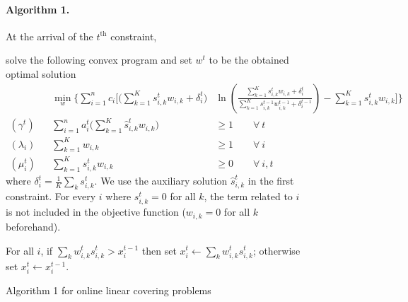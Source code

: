 \begin{figure}
\begin{mdframed}
\paragraph{Algorithm 1.} At the arrival of the $t^{\text{th}}$ constraint,
\begin{compactenum}
	\item solve the following convex program and set $w^t$ to be the obtained optimal solution
%
\begin{align*}
	&& \min_{w} \biggl\{\sum_{i=1}^{n} c_{i}  \biggl[  \biggl(\sum_{k=1}^{K} s_{i,k}^{t} w_{i,k}  + \delta_{i}^{t} \biggr) &
	\ln \left( \frac{\sum_{k=1}^{K} s_{i,k}^{t} w_{i,k}  + \delta_{i}^{t}}{ \sum_{k=1}^{K}  s_{i,k}^{t-1}w_{i,k}^{t-1}  + \delta_{i}^{t-1}}  \right)
	- \sum_{k=1}^{K}  s_{i,k}^{t} w_{i,k} \biggr] \biggr\} \\
		(\gamma^{t})  && \sum_{i=1}^{n} a_{i}^{t} \biggl( \sum_{k=1}^{K}  \hat{s}_{i,k}^{t} w_{i,k} \biggr) &\geq 1 \qquad \forall\ t\\
		(\lambda_{i}) && \sum_{k=1}^{K}  w_{i,k} &\geq 1 \qquad \forall\ i\\
		(\mu_{i}^{t}) && \sum_{k=1}^{K} s_{i,k}^{t} w_{i,k} &\geq 0 \qquad \forall\ i,t
	\end{align*}
	where $\delta_{i}^{t} = \frac{1}{K} \sum_{k} s_{i,k}^{t}$.
	We use the auxiliary solution $\hat{s}_{i,k}^{t}$ in the first constraint. For every $i$ where $s_{i,k}^{t} = 0$ for all $k$, the term related to $i$ is not included in the objective function ($w_{i,k} = 0$ for all $k$ beforehand).
	\item For all $i$, if $\sum_{k} w_{i,k}^{t} s_{i,k}^{t} > x_{i}^{t-1}$ then set $x_{i}^{t} \gets \sum_{k} w_{i,k}^{t} s_{i,k}^{t}$;
	otherwise set $x_{i}^{t} \gets x_{i}^{t-1}$.
\end{compactenum}
\end{mdframed}
	\caption{Algorithm 1 for online linear covering problems}
	\label{fig:algo1}
\end{figure}

